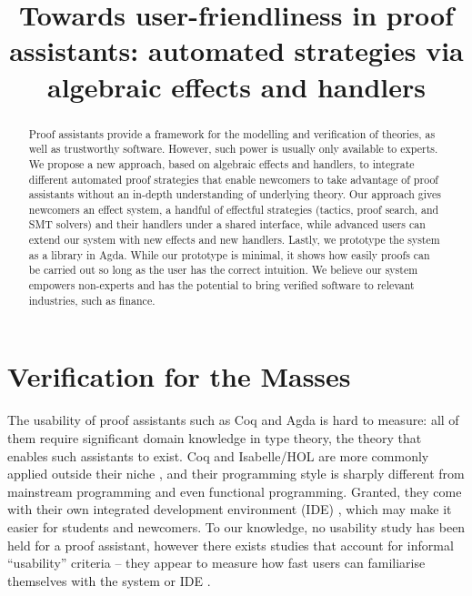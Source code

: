 \documentclass[sigconfl]{acmart}
\begin{document}
\title[Towards user-friendliness in proof assistants]{Towards user-friendliness
  in proof assistants: automated strategies \textbf{via} algebraic effects and handlers}



\begin{abstract}
Proof assistants provide a framework for the modelling and verification of
theories, as well as trustworthy software. However, such power is usually only
available to experts. We propose a new approach, based on algebraic effects and
handlers, to integrate different automated proof strategies that enable
newcomers to take advantage of proof assistants without an in-depth
understanding of underlying theory. Our approach gives newcomers an effect
system, a handful of effectful strategies (tactics, proof search, and SMT
solvers) and their handlers under a shared interface, while advanced users can
extend our system with new effects and new handlers. Lastly, we prototype the
system as a library in Agda. While our prototype is minimal, it shows how easily
proofs can be carried out so long as the user has the correct intuition. We
believe our system empowers non-experts and has the potential to bring verified
software to relevant industries, such as finance.
\end{abstract}


\maketitle

\section{Verification for the Masses}

The usability of proof assistants such as Coq \cite{DBLP:journals/corr/abs-cs-0603118} and Agda
\cite{DBLP:conf/tldi/Norell09} is
hard to measure: all of them require significant domain knowledge in type
theory, the theory that enables such assistants to exist. Coq and Isabelle/HOL
are more commonly applied outside their niche
\cite{DBLP:journals/corr/abs-1907-10674, peltier:hal-01562944}, and their programming style is
sharply different from
mainstream programming and even functional programming. Granted, they come with
their own integrated development environment (IDE)
\cite{DBLP:journals/sttt/FaithfullBTT18, DBLP:conf/itp/RoeS16}, which may make it easier for
students and newcomers. To our knowledge, no usability study has been
held for a proof assistant, however there exists studies that account for
informal ``usability'' criteria -- they appear to measure how fast users can
familiarise themselves with the system or IDE \cite{Wiedijk2003,
  DBLP:journals/corr/abs-1808-09701}.
\end{document}
